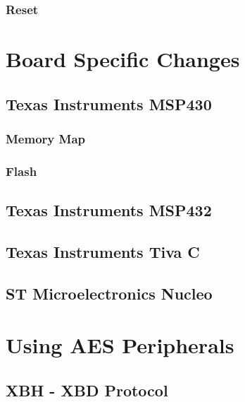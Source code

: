 \documentclass[twoside,11pt]{cergdoc}
\begin{document}
    \subsection{Reset}
\chapter{Board Specific Changes}
  \section{Texas Instruments MSP430}
    \subsection{Memory Map}
    \subsection{Flash}
  \section{Texas Instruments MSP432}
  \section{Texas Instruments Tiva C}
  \section{ST Microelectronics Nucleo}
\chapter{Using AES Peripherals}

\begin{appendix}
\chapter{XBH - XBD Protocol}
\end{appendix}
\end{document}
